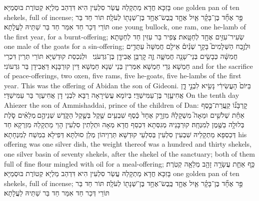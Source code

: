 {בָּזִכָּא חֲדָא מַתְקָלַהּ עֲשַׂר סִלְעִין הִיא דִּדְהַב מַלְיָא קְטוֹרֶת בּוּסְמַיָּא׃}
{one golden pan of ten shekels, full of incense;}{}
{פַּ֣ר אֶחָ֞ד בֶּן־בָּקָ֗ר אַ֧יִל אֶחָ֛ד כֶּֽבֶשׂ־אֶחָ֥ד בֶּן־שְׁנָת֖וֹ לְעֹלָֽה׃}
{תּוֹר חַד בַּר תּוֹרֵי דְּכַר חַד אִמַּר חַד בַּר שַׁתֵּיהּ לַעֲלָתָא׃}
{one young bullock, one ram, one he-lamb of the first year, for a burnt-offering;}{}
{שְׂעִיר־עִזִּ֥ים אֶחָ֖ד לְחַטָּֽאת׃}
{צְפִיר בַּר עִזִּין חַד לְחַטָּתָא׃}
{one male of the goats for a sin-offering;}{}
{וּלְזֶ֣בַח הַשְּׁלָמִים֮ בָּקָ֣ר שְׁנַ֒יִם֒ אֵילִ֤ם חֲמִשָּׁה֙ עַתֻּדִ֣ים חֲמִשָּׁ֔ה כְּבָשִׂ֥ים בְּנֵי־שָׁנָ֖ה חֲמִשָּׁ֑ה זֶ֛ה קׇרְבַּ֥ן אֲבִידָ֖ן בֶּן־גִּדְעֹנִֽי׃ \petucha }
{וּלְנִכְסַת קוּדְשַׁיָּא תּוֹרֵי תְּרֵין דִּכְרֵי חַמְשָׁא גְּדֵי חַמְשָׁא אִמְּרִין בְּנֵי שְׁנָא חַמְשָׁא דֵּין קוּרְבָּנָא דַּאֲבִידָן בַּר גִּדְעוֹנִי׃}
{and for the sacrifice of peace-offerings, two oxen, five rams, five he-goats, five he-lambs of the first year. This was the offering of Abidan the son of Gideoni.}{}
{בַּיּוֹם֙ הָעֲשִׂירִ֔י נָשִׂ֖יא לִבְנֵ֣י דָ֑ן אֲחִיעֶ֖זֶר בֶּן־עַמִּישַׁדָּֽי׃}
{בְּיוֹמָא עֲשִׂירָאָה רַבָּא לִבְנֵי דָן אֲחִיעֶזֶר בַּר עַמִּישַׁדָּי׃}
{On the tenth day Ahiezer the son of Ammishaddai, prince of the children of Dan:}{}
{קׇרְבָּנ֞וֹ קַֽעֲרַת־כֶּ֣סֶף אַחַ֗ת שְׁלֹשִׁ֣ים וּמֵאָה֮ מִשְׁקָלָהּ֒ מִזְרָ֤ק אֶחָד֙ כֶּ֔סֶף שִׁבְעִ֥ים שֶׁ֖קֶל בְּשֶׁ֣קֶל הַקֹּ֑דֶשׁ שְׁנֵיהֶ֣ם \legarmeh  מְלֵאִ֗ים סֹ֛לֶת בְּלוּלָ֥ה בַשֶּׁ֖מֶן לְמִנְחָֽה׃}
{קוּרְבָּנֵיהּ מְגִסְּתָא דִּכְסַף חֲדָא מְאָה וּתְלָתִין סִלְעִין הָוֵי מַתְקָלַהּ מִזְרְקָא חַד דְּכַסְפָּא מַתְקָלֵיהּ שִׁבְעִין סִלְעִין בְּסִלְעֵי קוּדְשָׁא תַּרְוֵיהוֹן מְלַן סוּלְתָּא דְּפִילָא בִמְשַׁח לְמִנְחָתָא׃}
{his offering was one silver dish, the weight thereof was a hundred and thirty shekels, one silver basin of seventy shekels, after the shekel of the sanctuary; both of them full of fine flour mingled with oil for a meal-offering;}{}
{כַּ֥ף אַחַ֛ת עֲשָׂרָ֥ה זָהָ֖ב מְלֵאָ֥ה קְטֹֽרֶת׃}
{בָּזִכָּא חֲדָא מַתְקָלַהּ עֲשַׂר סִלְעִין הִיא דִּדְהַב מַלְיָא קְטוֹרֶת בּוּסְמַיָּא׃}
{one golden pan of ten shekels, full of incense;}{}
{פַּ֣ר אֶחָ֞ד בֶּן־בָּקָ֗ר אַ֧יִל אֶחָ֛ד כֶּֽבֶשׂ־אֶחָ֥ד בֶּן־שְׁנָת֖וֹ לְעֹלָֽה׃}
{תּוֹר חַד בַּר תּוֹרֵי דְּכַר חַד אִמַּר חַד בַּר שַׁתֵּיהּ לַעֲלָתָא׃}

